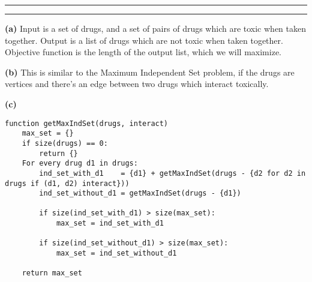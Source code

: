 \documentclass[11pt,letterpaper]{article}
\newcommand{\question}[1] {\vspace{.25in} \hrule\vspace{0.5em}
\noindent{\bf #1} \vspace{0.5em}
\hrule \vspace{.10in}}
\renewcommand{\part}[1] {\vspace{.10in} {\bf (#1)}}
\begin{document}
\question{4}
\part{a}
Input is a set of drugs, and a set of pairs of drugs which are toxic when taken together.
Output is a list of drugs which are not toxic when taken together.
Objective function is the length of the output list, which we will maximize.

\part{b}
This is similar to the Maximum Independent Set problem, if the drugs are vertices and there's an edge between two drugs which interact toxically.

\part{c}

\begin{verbatim}
function getMaxIndSet(drugs, interact)
    max_set = {}
    if size(drugs) == 0:
        return {}
    For every drug d1 in drugs:
        ind_set_with_d1    = {d1} + getMaxIndSet(drugs - {d2 for d2 in drugs if (d1, d2) interact}))
        ind_set_without_d1 = getMaxIndSet(drugs - {d1})

        if size(ind_set_with_d1) > size(max_set):
            max_set = ind_set_with_d1

        if size(ind_set_without_d1) > size(max_set):
            max_set = ind_set_without_d1

    return max_set
\end{verbatim}
\end{document}
